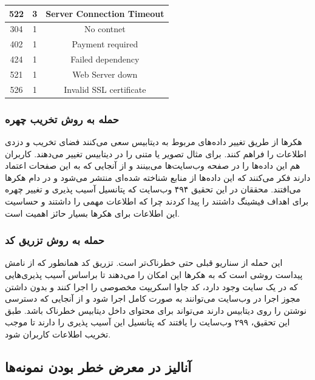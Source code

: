 \documentclass[10pt, a4paper]{article}
\begin{document}
\begin{LTR}
\begin{table}[h]
{\begin{tabular}{|c|c|c|}
                522 & 3 & Server Connection Timeout \\ \hline
                304 & 1 & No contnet \\ \hline
                402 & 1 & Payment required \\ \hline
                424 & 1 & Failed dependency \\ \hline
                521 & 1 & Web Server down \\ \hline
                526 & 1 & Invalid SSL certificate \\ \hline
            \end{tabular}
        }
    \end{table}
\end{LTR}

\subsubsection{حمله به روش تخریب چهره}

هکر‌ها از طریق تغییر داده‌های مربوط به دیتابیس سعی می‌کنند فضای تخریب و دزدی
اطلاعات را فراهم کنند. برای مثال تصویر یا متنی را در دیتابیس تغییر می‌دهند.
کاربران هم این داده‌ها را در صفحه وب‌سایت‌ها می‌بینند و از آنجایی که به این
صفحات اعتماد دارند فکر می‌کنند که این داده‌ها از منابع شناخته شده‌ای منتشر
می‌شود و در دام هکر‌ها می‌افتند. محققان در این تحقیق ۴۹۴ وب‌سایت که پتانسیل آسیب
پذیری و تغییر چهره برای اهداف فیشینگ داشتند را پیدا کردند چرا که اطلاعات مهمی را
داشتند و حساسیت این اطلاعات برای هکر‌ها بسیار حائز اهمیت است.

\subsubsection{حمله به روش تزریق کد}

این حمله از سناریو قبلی حتی خطرناک‌تر است. تزریق کد همانطور که از نامش پیداست
روشی است که به هکر‌ها این امکان را می‌دهند تا براساس آسیب پذیری‌هایی که در یک
سایت وجود دارد، کد جاوا اسکریپت مخصوصی را اجرا کنند و بدون داشتن مجوز اجرا در
وب‌سایت می‌توانند به صورت کامل اجرا شود و از آنجایی که دسترسی نوشتن را روی
دیتابیس دارند می‌تواند برای محتوای داخل دیتابیس خطرناک باشد. طبق این تحقیق، ۲۹۹
وب‌سایت را یافتند که پتانسیل این آسیب پذیری را دارند تا موجب تخریب اطلاعات
کاربران شود.

\subsection{آنالیز در معرض خطر بودن نمونه‌ها}
\end{document}
